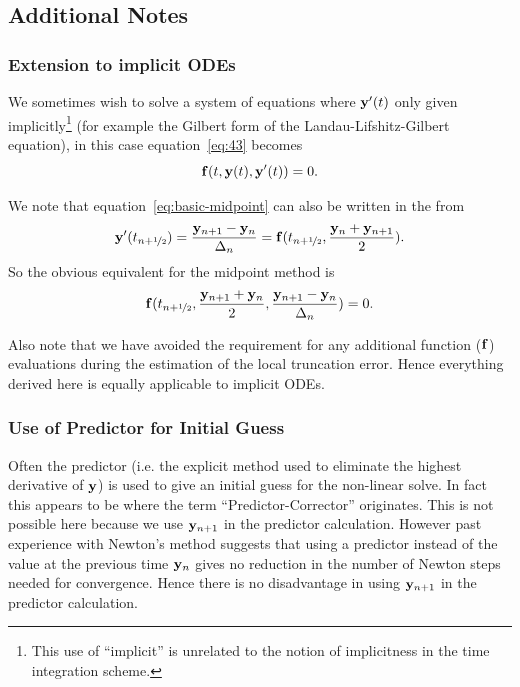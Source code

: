 \subsection{Additional Notes}

\subsubsection{Extension to implicit ODEs}
\label{sec:extens-impl-odes}

We sometimes wish to solve a system of equations where $\mathbf{y}'(t)$ only given implicitly\footnote{This use of ``implicit'' is unrelated to the notion of implicitness in the time integration scheme.} (for example the Gilbert form of the Landau-Lifshitz-Gilbert equation), in this case equation~\eqref{eq:43} becomes
\begin{equation}
  {\mathbf{f}}(t, \mathbf{y}(t), \mathbf{y}'(t)) = 0.
\end{equation}

We note that equation~\eqref{eq:basic-midpoint} can also be written in the from
\begin{equation}
  \mathbf{y}'(t_{n+\nicefrac{1}{2}}) = \frac{\mathbf{y}_{n+1} - \mathbf{y}_n}{\Delta_{n}} =  {\mathbf{f}}(t_{n+\nicefrac{1}{2}}, \frac{\mathbf{y}_n + \mathbf{y}_{n+1}}{2}).
\end{equation}
So the obvious equivalent for the midpoint method is
\begin{equation}
  {\mathbf{f}}(t_{n+\nicefrac{1}{2}}, \frac{\mathbf{y}_{n+1} + \mathbf{y}_n}{2}, \frac{\mathbf{y}_{n+1} - \mathbf{y}_n}{\Delta_{n}}) = 0.
\end{equation}

Also note that we have avoided the requirement for any additional function (\ie ${\mathbf{f}}$) evaluations during the estimation of the local truncation error.
Hence everything derived here is equally applicable to implicit ODEs.


\subsubsection{Use of Predictor for Initial Guess}

Often the predictor (i.e. the explicit method used to eliminate the highest derivative of $\mathbf{y}$) is used to give an initial guess for the non-linear solve.
In fact this appears to be where the term ``Predictor-Corrector'' originates.
This is not possible here because we use $\mathbf{y}_{n+1}$ in the predictor calculation.
However past experience with Newton's method suggests that using a predictor instead of the value at the previous time $\mathbf{y}_n$ gives no reduction in the number of Newton steps needed for convergence.\cite{Milan, Matthias}
Hence there is no disadvantage in using $\mathbf{y}_{n+1}$ in the predictor calculation.

